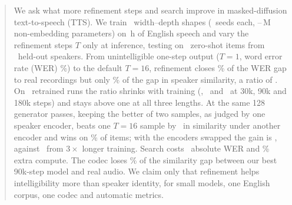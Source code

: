 \begin{abstract}
We ask what more refinement steps and search improve in masked-diffusion text-to-speech
(TTS). We train \Nconfigs\ width--depth shapes (\Nseeds\ seeds each,
\NminN--\NmaxN\,M non-embedding parameters) on \NtrainHours\,h of English speech and vary
the refinement steps $T$ only at inference, testing on \NevalItems\ zero-shot items from
\NevalSpeakers\ held-out speakers. From unintelligible one-step output ($T{=}1$, word error
rate (WER) \Nwertone\%) to the default $T{=}16$, refinement closes \NgapWER\% of the WER gap
to real recordings but only \NgapSIM\% of the gap in speaker similarity, a ratio of
\NgapRatio. On \NtrendRuns\ retrained runs the ratio shrinks with training
(\NgapThirtykRatio, \NgapNinetykRatio\ and \NgapEightykRatio\ at 30k, 90k and 180k steps) and
stays above one at all three lengths. At the same 128 generator passes, keeping the better
of two samples, as judged by one speaker encoder, beats one $T{=}16$ sample by \NcrMatchLod\
in similarity under another encoder and wins on \NcrMatchLowin\% of items; with the encoders
swapped the gain is \NcrXEWLod, against \NtrainGainSim\ from $3\times$ longer training.
Search costs \NcrLedgerSearchWER\ absolute WER and \NcrCostTwopct\% extra compute. The codec
loses \NcodecShare\% of the similarity gap between our best 90k-step model and real audio. We
claim only that refinement helps intelligibility more than speaker identity, for small
models, one English corpus, one codec and automatic metrics.
\end{abstract}

